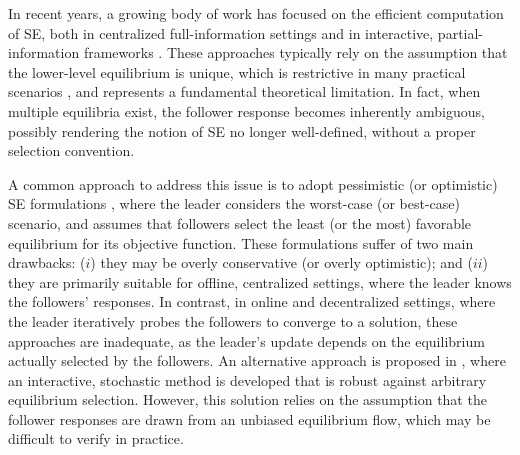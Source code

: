 \documentclass[letterpaper, 10 pt, conference]{ieeeconf}
\begin{document}
In recent years, a growing body of work has focused on the efficient computation of SE, both in centralized full-information settings \cite{dempe2002foundations} and in interactive, partial-information frameworks \cite{ maheshwari2024follower, maljkovic2025decentralized, grontas2024big}. 
These approaches typically rely on the assumption that the lower-level equilibrium is unique, which is restrictive in many practical scenarios \cite{jeroslow1985polynomial}, and represents a fundamental theoretical limitation. In fact, when multiple equilibria exist, the follower response becomes inherently ambiguous, possibly rendering the notion of SE no longer well-defined, without a proper selection convention. 

A common approach to address this issue is to adopt pessimistic (or optimistic) SE formulations \cite{zemkoho2016solving,liu2020generic, dempe2014solution}, where the leader considers the worst-case (or best-case) scenario, and assumes that followers select the least (or the most) favorable equilibrium for its objective function. These formulations suffer of two main drawbacks: ($i$) they may be overly conservative (or overly optimistic); and ($ii$) they are primarily suitable for offline, centralized settings, where the leader knows the followers' responses. In contrast, in online and decentralized settings, where the leader iteratively probes the followers to converge to a solution, these approaches are inadequate, as the leader’s update depends on the equilibrium actually selected by the followers. An alternative approach is proposed in \cite{wang2022coordinating}, where an interactive, stochastic method is developed that is robust against arbitrary equilibrium selection. However, this solution relies on the assumption that the follower responses are drawn from an unbiased equilibrium flow, which may be difficult to verify in practice.
\end{document}
